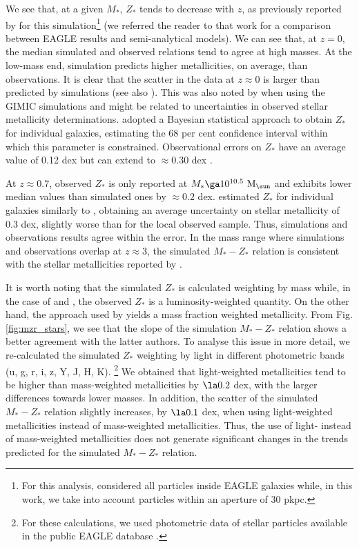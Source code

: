 \documentclass[useAMS,usenatbib]{mn2e}
\begin{document}
We see that, at a given $M_*$, $Z_*$ tends to decrease with $z$, as previously reported
by \citet{guo2016} for this simulation\footnote{For this analysis, 
\citet{guo2016} considered all particles inside {\sc EAGLE} 
galaxies while, in this work, we take into account particles within an aperture of 30 pkpc.}
(we referred the reader to that work for a comparison
between {\sc EAGLE} results and semi-analytical models).
We can see that, at $z=0$, the median simulated and observed relations tend to agree at high masses.  
At the low-mass end, simulation predicts higher metallicities, on average, than observations.
It is clear that the scatter in the data at $z\approx0$
is larger than predicted by simulations (see also \citealt{schaye2015}).
This was also noted by \citet{derossi2015} when using the {\sc GIMIC} simulations 
and might be related to uncertainties in observed stellar metallicity determinations.
\citet{gallazzi2005} adopted a Bayesian statistical approach to obtain $Z_*$ for individual galaxies, estimating 
the 68 per cent confidence interval within which this parameter
is constrained.   
Observational errors on $Z_*$ have an average value of 0.12 dex but can extend to $\approx 0.30$ dex
\citep[see][for further details]{gallazzi2005}.


At $z \approx 0.7$, observed $Z_*$ is only reported at $M_* \ga 10^{10.5} \ {\rm M}_{\sun}$ 
and exhibits lower median values than simulated ones by $\approx 0.2$ dex.
\citet{gallazzi2014} estimated $Z_*$ for individual galaxies similarly to \citet{gallazzi2005}, obtaining
an average uncertainty on stellar metallicity of 0.3 dex, slightly worse than for the local observed sample.
Thus, simulations and observations results agree within the error. 
In the mass range where simulations and observations overlap at $z \approx 3$, the simulated
$M_* - Z_*$ relation is consistent with the stellar metallicities reported by \citet{sommariva2011}.

It is worth noting that the simulated $Z_*$ is calculated weighting by mass while, in 
the case of \citet{gallazzi2005, gallazzi2014} and \citet{sommariva2011},
the observed $Z_*$ is a luminosity-weighted quantity. 
On the other hand, the approach used by \citet{panter2008} yields a mass fraction 
weighted metallicity. From Fig. \ref{fig:mzr_stars}, we see that the slope of the simulation
$M_* - Z_*$ relation shows a better agreement with the latter authors.
To analyse this issue in more detail, we re-calculated 
the simulated $Z_*$ 
weighting by light in different photometric bands (u, g, r, i, z, Y, J, H, K).
\footnote{For these calculations, we used photometric data of stellar particles
available in the public EAGLE database \citep{mcalpine2015}.}
We obtained that light-weighted metallicities tend to be higher than mass-weighted metallicities 
by $\la 0.2$ dex, with the larger differences towards lower masses. 
In addition, the scatter of the 
simulated $M_* - Z_*$ relation slightly increases, by $\la 0.1$ dex, when using light-weighted metallicities
instead of mass-weighted metallicities.  
Thus, the use of light- instead of mass-weighted metallicities 
does not generate significant changes in the trends predicted for the simulated
$M_* - Z_*$ relation.
\end{document}
